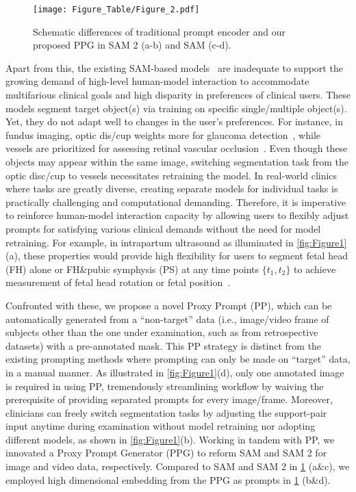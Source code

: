 \begin{figure}
  \centering
  \setlength{\abovecaptionskip}{3pt}
   \texttt{[image: Figure\_Table/Figure\_2.pdf]}
   \caption{Schematic differences of traditional prompt encoder and our proposed PPG in SAM 2 (a-b) and SAM (c-d).}
   \label{fig:Figure2}
   \vspace{-15pt}
\end{figure}

Apart from this, the existing SAM-based models~\cite{shaharabany2023autosam, zhang2023customized, wu2023self} are inadequate to support the growing demand of high-level human-model interaction to accommodate multifarious clinical goals and high disparity in preferences of clinical users. These models segment target object(s) via training on specific single/multiple object(s). Yet, they do not adapt well to changes in the user’s preferences. For instance, in fundus imaging, optic dis/cup weights more for glaucoma detection~\cite{thakur2018survey}, while vessels are prioritized for assessing retinal vascular occlusion~\cite{sekhar2008automated}. Even though these objects may appear within the same image, switching segmentation task from the optic disc/cup to vessels necessitates retraining the model. In real-world clinics where tasks are greatly diverse, creating separate models for individual tasks is practically challenging and computational demanding. Therefore, it is imperative to reinforce human-model interaction capacity by allowing users to flexibly adjust prompts for satisfying various clinical demands without the need for model retraining. For example, in intrapartum ultrasound as illuminated in \cref{fig:Figure1}(a), these properties would provide high flexibility for users to segment fetal head (FH) alone or FH\&pubic symphysis (PS) at any time points \(\{t_{1}, t_{2}\}\) to achieve measurement of fetal head rotation or fetal position~\cite{ghi2018isuog}.

Confronted with these, we propose a novel Proxy Prompt (PP), which can be automatically generated from a ``non-target'' data (i.e., image/video frame of subjects other than the one under examination, such as from retrospective datasets) with a pre-annotated mask. This PP strategy is distinct from the existing prompting methods where prompting can only be made on ``target'' data, in a manual manner. As illustrated in \cref{fig:Figure1}(d), only one annotated image is required in using PP, tremendously streamlining workflow by waiving the prerequisite of providing separated prompts for every image/frame. Moreover, clinicians can freely switch segmentation tasks by adjusting the support-pair input anytime during examination without model retraining nor adopting different models, as shown in \cref{fig:Figure1}(b). Working in tandem with PP, we innovated a Proxy Prompt Generator (PPG) to reform SAM and SAM 2 for image and video data, respectively. Compared to SAM and SAM 2 in \cref{fig:Figure2} (a\&c), we employed high dimensional embedding from the PPG as prompts in \cref{fig:Figure2} (b\&d).

